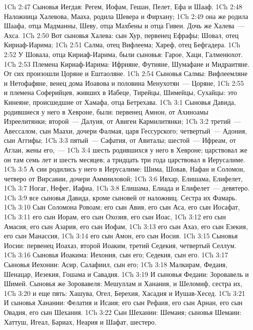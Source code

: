 \vs 1Ch 2:47 Сыновья Иегдая: Регем, Иофам, Гешан, Пелет, Ефа и Шааф.
\vs 1Ch 2:48 Наложница Халевова, Мааха, родила Шевера и Фирхану;
\vs 1Ch 2:49 она же родила Шаафа, отца Мадманны, Шеву, отца Махбены и отца Гивеи. Дочь же Халева~--- Ахса.
\rsbpar\vs 1Ch 2:50 Вот сыновья Халева: сын Хур, первенец Ефрафы; Шовал, отец Кириаф-Иарима;
\vs 1Ch 2:51 Салма, отец Вифлеема; Хареф, отец Бефгадера.
\vs 1Ch 2:52 У Шовала, отца Кириаф-Иарима, были сыновья: Гарое, Хаци, Галменюхот.
\vs 1Ch 2:53 Племена Кириаф-Иарима: Ифрияне, Футияне, Шумафане и Мидраитяне. От сих произошли Цоряне и Ештаоляне.
\vs 1Ch 2:54 Сыновья Салмы: Вифлеемляне и Нетофафяне, венец дома Иоавова и половина Менухотян~--- Цоряне,
\vs 1Ch 2:55 и племена Соферийцев, живших в Иабеце, Тирейцы, Шимейцы, Сухайцы: это Кинеяне, происшедшие от Хамафа, отца Бетрехава.
\vs 1Ch 3:1 Сыновья Давида, родившиеся у него в Хевроне, были: первенец Амнон, от Ахиноамы Изреелитянки; второй~--- Далуия, от Авигеи Кармилитянки;
\vs 1Ch 3:2 третий~--- Авессалом, сын Маахи, дочери Фалмая, царя Гессурского; четвертый~--- Адония, сын Аггифы;
\vs 1Ch 3:3 пятый~--- Сафатия, от Авиталы; шестой~--- Ифреам, от Аглаи, жены его,~---
\vs 1Ch 3:4 шесть родившихся у него в Хевроне; царствовал же он там семь лет и шесть месяцев; а тридцать три года царствовал в Иерусалиме.
\rsbpar\vs 1Ch 3:5 А сии родились у него в Иерусалиме: Шима, Шовав, Нафан и Соломон, четверо от Вирсавии, дочери Аммииловой;
\vs 1Ch 3:6 Ивхар, Елишама, Елифелет,
\vs 1Ch 3:7 Ногаг, Нефег, Иафиа,
\vs 1Ch 3:8 Елишама, Елиада и Елифелет~--- девятеро.
\vs 1Ch 3:9  все сыновья Давида, кроме сыновей от наложниц. Сестра их Фамарь.
\rsbpar\vs 1Ch 3:10 Сын Соломона Ровоам; его сын Авия, его сын Аса, его сын Иосафат,
\vs 1Ch 3:11 его сын Иорам, его сын Охозия, его сын Иоас,
\vs 1Ch 3:12 его сын Амасия, его сын Азария, его сын Иофам,
\vs 1Ch 3:13 его сын Ахаз, его сын Езекия, его сын Манассия,
\vs 1Ch 3:14 его сын Амон, его сын Иосия.
\vs 1Ch 3:15 Сыновья Иосии: первенец Иоахаз, второй Иоаким, третий Седекия, четвертый Селлум.
\vs 1Ch 3:16 Сыновья Иоакима: Иехония, сын его; Седекия, сын его.
\rsbpar\vs 1Ch 3:17 Сыновья Иехонии: Асир, Салафиил, сын его;
\vs 1Ch 3:18 Малкирам, Федаия, Шенацар, Иезекия, Гошама и Савадия.
\vs 1Ch 3:19 И сыновья Федаии: Зоровавель и Шимей. Сыновья же Зоровавеля: Мешуллам и Ханания, и Шеломиф, сестра их,
\vs 1Ch 3:20 и еще пять: Хашува, Огел, Берехия, Хасадия и Иушав-Хесед.
\vs 1Ch 3:21 И сыновья Ханании: Фелатия и Исаия; его сын Рефаия, его сын Арнан, его сын Овадия, его сын Шехания.
\vs 1Ch 3:22 Сын Шехании: Шемаия; сыновья Шемаии: Хаттуш, Игеал, Бариах, Неария и Шафат, шестеро.
